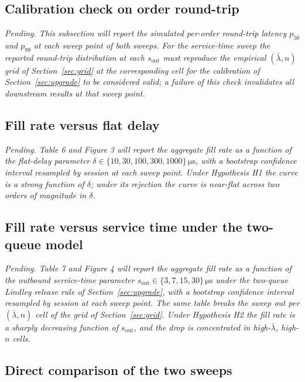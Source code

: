 \documentclass[11pt]{article}
\begin{document}
\subsection{Calibration check on order round-trip}
\label{sec:experiment-check}

\emph{Pending. This subsection will report the simulated per-order round-trip latency $p_{50}$ and $p_{99}$ at each sweep point of both sweeps. For the service-time sweep the reported round-trip distribution at each $s_{\mathrm{out}}$ must reproduce the empirical $(\bar\lambda, n)$ grid of Section~\ref{sec:grid} at the corresponding cell for the calibration of Section~\ref{sec:upgrade} to be considered valid; a failure of this check invalidates all downstream results at that sweep point.}

\subsection{Fill rate versus flat delay}
\label{sec:experiment-flat}

\emph{Pending. Table 6 and Figure 3 will report the aggregate fill rate as a function of the flat-delay parameter $\delta \in \{10, 30, 100, 300, 1000\}\,\si{\micro\second}$, with a bootstrap confidence interval resampled by session at each sweep point. Under Hypothesis H1 the curve is a strong function of $\delta$; under its rejection the curve is near-flat across two orders of magnitude in $\delta$.}

\subsection{Fill rate versus service time under the two-queue model}
\label{sec:experiment-service}

\emph{Pending. Table 7 and Figure 4 will report the aggregate fill rate as a function of the outbound service-time parameter $s_{\mathrm{out}} \in \{3, 7, 15, 30\}\,\si{\micro\second}$ under the two-queue Lindley release rule of Section~\ref{sec:upgrade}, with a bootstrap confidence interval resampled by session at each sweep point. The same table breaks the sweep out per $(\bar\lambda, n)$ cell of the grid of Section~\ref{sec:grid}. Under Hypothesis H2 the fill rate is a sharply decreasing function of $s_{\mathrm{out}}$, and the drop is concentrated in high-$\bar\lambda$, high-$n$ cells.}

\subsection{Direct comparison of the two sweeps}
\label{sec:experiment-compare}
\end{document}
